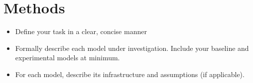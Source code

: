 \section{Methods}

\begin{itemize}
  \item Define your task in a clear, concise manner
  \item Formally describe each model under investigation. Include your baseline and experimental models at minimum.
  \item For each model, describe its infrastructure and assumptions (if applicable).
\end{itemize}
